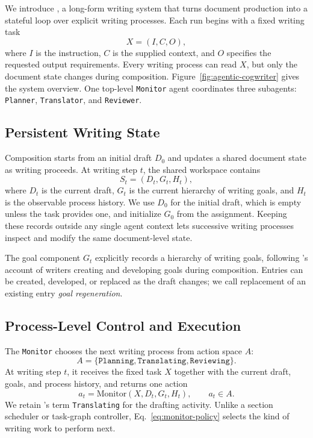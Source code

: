 We introduce \condAgenticCogWriter, a long-form writing system that turns document production into a stateful loop over explicit writing processes.
Each run begins with a fixed writing task
\begin{equation}
X=(I,C,O),
\end{equation}
where $I$ is the instruction, $C$ is the supplied context, and $O$ specifies the requested output requirements.
Every writing process can read $X$, but only the document state changes during composition.
Figure~\ref{fig:agentic-cogwriter} gives the system overview.
One top-level \texttt{Monitor} agent coordinates three subagents: \texttt{Planner}, \texttt{Translator}, and \texttt{Reviewer}.

\subsection{Persistent Writing State}
\label{sec:method-control-state}

Composition starts from an initial draft $D_0$ and updates a shared document state as writing proceeds.
At writing step $t$, the shared workspace contains
\begin{equation}
S_t=(D_t,G_t,H_t),
\end{equation}
where $D_t$ is the current draft, $G_t$ is the current hierarchy of writing goals, and $H_t$ is the observable process history.
We use $D_0$ for the initial draft, which is empty unless the task provides one, and initialize $G_0$ from the assignment.
Keeping these records outside any single agent context lets successive writing processes inspect and modify the same document-level state.

The goal component $G_t$ explicitly records a hierarchy of writing goals, following \citet{flower1981cognitive}'s account of writers creating and developing goals during composition.
Entries can be created, developed, or replaced as the draft changes; we call replacement of an existing entry \emph{goal regeneration}.

\subsection{Process-Level Control and Execution}
\label{sec:method-writing-processes}

The \texttt{Monitor} chooses the next writing process from action space $A$:
\begin{equation}
A=\{\texttt{Planning},\texttt{Translating},\texttt{Reviewing}\}.
\end{equation}
At writing step $t$, it receives the fixed task $X$ together with the current draft, goals, and process history, and returns one action
\begin{equation}
a_t=\mathrm{Monitor}(X,D_t,G_t,H_t), \qquad a_t\in A.
\label{eq:monitor-policy}
\end{equation}
We retain \citet{flower1981cognitive}'s term \texttt{Translating} for the drafting activity.
Unlike a section scheduler or task-graph controller, Eq.~\eqref{eq:monitor-policy} selects the kind of writing work to perform next.

